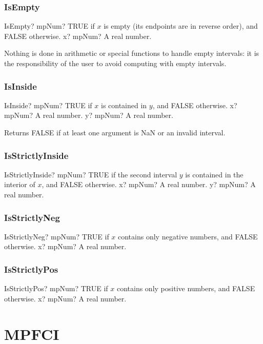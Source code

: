 \subsection{IsEmpty}

\begin{mpFunctionsExtract}
	\mpFunctionOne
	{IsEmpty? mpNum? TRUE  if $x$ is empty (its endpoints are in reverse order), and FALSE otherwise.}
	{x? mpNum? A real number.}
\end{mpFunctionsExtract}

\vspace{0.3cm}
Nothing is done in arithmetic or special functions to handle empty intervals: it is the responsibility of the user to avoid computing with empty intervals.




\subsection{IsInside}

\begin{mpFunctionsExtract}
	\mpFunctionTwo
	{IsInside? mpNum? TRUE  if $x$ is contained in $y$, and FALSE otherwise.}
	{x? mpNum? A real number.}
	{y? mpNum? A real number.}
\end{mpFunctionsExtract}

\vspace{0.3cm}
Returns FALSE if at least one argument is NaN or an invalid interval.




\subsection{IsStrictlyInside}

\begin{mpFunctionsExtract}
	\mpFunctionTwo
	{IsStrictlyInside? mpNum? TRUE  if the second interval $y$ is contained in the interior of $x$, and FALSE otherwise.}
	{x? mpNum? A real number.}
	{y? mpNum? A real number.}
\end{mpFunctionsExtract}




\subsection{IsStrictlyNeg}

\begin{mpFunctionsExtract}
	\mpFunctionOne
	{IsStrictlyNeg? mpNum? TRUE if $x$ contains only negative numbers, and FALSE otherwise.}
	{x? mpNum? A real number.}
\end{mpFunctionsExtract}




\subsection{IsStrictlyPos}

\begin{mpFunctionsExtract}
	\mpFunctionOne
	{IsStrictlyPos? mpNum? TRUE if $x$ contains only positive numbers, and FALSE otherwise.}
	{x? mpNum? A real number.}
\end{mpFunctionsExtract}








\chapter{MPFCI}
\lipsum[1]
